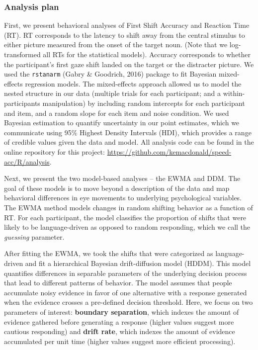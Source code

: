 \documentclass[10pt, letterpaper]{article}
\begin{document}
\subsubsection{Analysis plan}\label{analysis-plan}

First, we present behavioral analyses of First Shift Accuracy and
Reaction Time (RT). RT corresponds to the latency to shift away from the
central stimulus to either picture measured from the onset of the target
noun. (Note that we log-transformed all RTs for the statistical models).
Accuracy corresponds to whether the participant's first gaze shift
landed on the target or the distracter picture. We used the
\texttt{rstanarm} (Gabry \& Goodrich, 2016) package to fit Bayesian
mixed-effects regression models. The mixed-effects approach allowed us
to model the nested structure in our data (multiple trials for each
participant; and a within-participants manipulation) by including random
intercepts for each participant and item, and a random slope for each
item and noise condition. We used Bayesian estimation to quantify
uncertainty in our point estimates, which we communicate using 95\%
Highest Density Intervals (HDI), which provides a range of credible
values given the data and model. All analysis code can be found in the
online repository for this project:
\url{https://github.com/kemacdonald/speed-acc/R/analysis}.

Next, we present the two model-based analyses -- the EWMA and DDM. The
goal of these models is to move beyond a description of the data and map
behavioral differences in eye movements to underlying psychological
variables. The EWMA method models changes in random shifting behavior as
a function of RT. For each participant, the model classifies the
proportion of shifts that were likely to be language-driven as opposed
to random responding, which we call the \emph{guessing} parameter.

After fitting the EWMA, we took the shifts that were categorized as
language-driven and fit a hierarchical Bayesian drift-diffusion model
(HDDM). This model quantifies differences in separable parameters of the
underlying decision process that lead to different patterns of behavior.
The model assumes that people accumulate noisy evidence in favor of one
alternative with a response generated when the evidence crosses a
pre-defined decision threshold. Here, we focus on two parameters of
interest: \textbf{boundary separation}, which indexes the amount of
evidence gathered before generating a response (higher values suggest
more cautious responding) and \textbf{drift rate}, which indexes the
amount of evidence accumulated per unit time (higher values suggest more
efficient processing).
\end{document}
